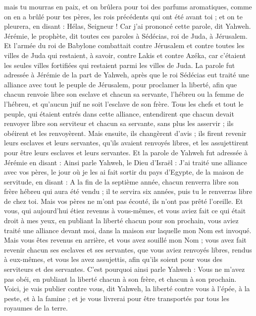 \begin{multicols}{2}
mais tu mourras en paix, et on brûlera pour toi des parfums aromatiques, comme on en a brûlé pour tes pères, les rois précédents qui ont été avant toi ; et on te pleurera, en disant : Hélas, Seigneur ! Car j'ai prononcé cette parole, dit Yahweh.
Jérémie, le prophète, dit toutes ces paroles à Sédécias, roi de Juda, à Jérusalem.
Et l'armée du roi de Babylone combattait contre Jérusalem et contre toutes les villes de Juda qui restaient, à savoir, contre Lakis et contre Azéka, car c'étaient les seules villes fortifiées qui restaient parmi les villes de Juda.
La parole fut adressée à Jérémie de la part de Yahweh, après que le roi Sédécias eut traité une alliance avec tout le peuple de Jérusalem, pour proclamer la liberté,
afin que chacun renvoie libre son esclave et chacun sa servante, l'hébreu ou la femme de l'hébreu, et qu'aucun juif ne soit l'esclave de son frère.
Tous les chefs et tout le peuple, qui étaient entrés dans cette alliance, entendirent que chacun devait renvoyer libre son serviteur et chacun sa servante, sans plus les asservir ; ils obéirent et les renvoyèrent.
Mais ensuite, ils changèrent d'avis ; ils firent revenir leurs esclaves et leurs servantes, qu'ils avaient renvoyés libres, et les assujettirent pour être leurs esclaves et leurs servantes.
Et la parole de Yahweh fut adressée à Jérémie en disant :
Ainsi parle Yahweh, le Dieu d'Israël : J'ai traité une alliance avec vos pères, le jour où je les ai fait sortir du pays d'Egypte, de la maison de servitude, en disant :
A la fin de la septième année, chacun renverra libre son frère hébreu qui aura été vendu ; il te servira six années, puis tu le renverras libre de chez toi. Mais vos pères ne m'ont pas écouté, ils n'ont pas prêté l'oreille.
Et vous, qui aujourd'hui étiez revenus à vous-mêmes, et vous aviez fait ce qui était droit à mes yeux, en publiant la liberté chacun pour son prochain, vous aviez traité une alliance devant moi, dans la maison sur laquelle mon Nom est invoqué.
Mais vous êtes revenus en arrière, et vous avez souillé mon Nom ; vous avez fait revenir chacun ses esclaves et ses servantes, que vous aviez renvoyés libres, rendus à eux-mêmes, et vous les avez assujettis, afin qu'ils soient pour vous des serviteurs et des servantes.
C'est pourquoi ainsi parle Yahweh : Vous ne m'avez pas obéi, en publiant la liberté chacun à son frère, et chacun à son prochain. Voici, je vais publier contre vous, dit Yahweh, la liberté contre vous à l'épée, à la peste, et à la famine ;  et je vous livrerai pour être transportés par tous les royaumes de la terre.

\end{multicols}
